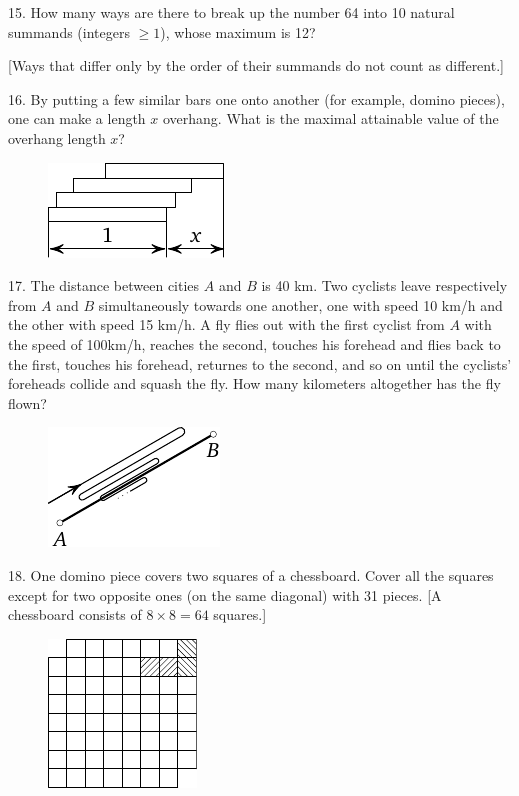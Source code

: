 \begin{problem}{15.}
	How many ways are there to break up the number 64 into 10 natural summands (integers $\ge 1$),
	whose maximum is 12?

	[Ways that differ only by the order of their summands do not count as different.]
\end{problem}

\begin{problem}{16.}
	By putting a few similar bars one onto another (for example, domino pieces),
	one can make a length $x$ overhang. What is the maximal attainable value of the overhang length $x$?

	\begin{figure}[h!]
	\centering
	\footnotesize
	\includegraphics[scale=1]{taskbook-97}
	\end{figure}
\end{problem}

\begin{problem}{17.}
	The distance between cities $A$ and $B$ is 40 km. Two cyclists leave respectively from $A$ and $B$ simultaneously
	towards one another, one with speed 10 km/h and the other with speed 15 km/h. A fly flies out with the first
	cyclist from $A$ with the speed of 100km/h, reaches the second, touches his forehead and flies back to the first,
	touches his forehead, returnes to the second, and so on until the cyclists' foreheads collide and squash
	the fly.
	How many kilometers altogether has the fly flown?
	\begin{figure}[h]
	\includegraphics[scale=1]{taskbook-1}
	\end{figure}
\end{problem}

\begin{problem}{18.}
	One domino piece covers two squares of a chessboard. 
	Cover all the squares
	except for two opposite ones (on the same diagonal) with 31 pieces. [A chessboard consists of $8 \times 8 = 64$ squares.]
	\begin{figure}[h]
	\centering
	\footnotesize
	\includegraphics[scale=1]{taskbook-2}
	\end{figure}
\end{problem}


